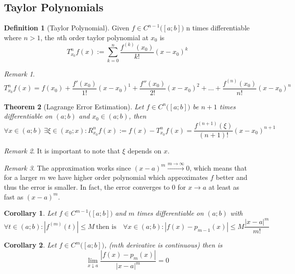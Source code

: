 \documentclass[english,titlepage]{uzhpub}
\theoremstyle{definition}
\newtheorem{definition}{Definition}[section]
\theoremstyle{plain}
\newtheorem{theorem}[definition]{Theorem} %
\newtheorem{corollary}{Corollary}[theorem]
\theoremstyle{remark}
\newtheorem*{remark}{Remark}
\theoremstyle{example}
\begin{document}
   \subsection{Taylor Polynomials}
   \begin{definition}[Taylor Polynomial]
      Given \(f \in C^{n-1}\big([a;b]\big)\) n times differentiable where \(n > 1\), the \textit{n}th order taylor polynomial at \(x_0\) is
      \[T_{x_0}^n f(x) := \sum_{k=0}^n \frac{f^{(k)}(x_0)}{k!} (x - x_0)^k\]
   \end{definition}
   \begin{remark}
      \[T_{x_0}^n f(x) = f(x_0) + \frac{f'(x_0)}{1!}(x - x_0)^1 + \frac{f''(x_0)}{2!}(x-x_0)^2 + \ldots + \frac{f^{(n)}(x_0)}{n!} (x-x_0)^n\]
   \end{remark}

   \begin{theorem}[Lagrange Error Estimation]\label{thm:talyor_approx}
      Let \(f \in C^{n}\big([a; b]\big)\) be \(n+1\) times differentiable on \((a; b)\) and \(x_0 \in (a; b)\), then
      \[\forall x \in (a;b)~\exists \xi \in (x_0; x): R_{x_0}^n f(x) := f(x) - T_{x_0}^n f(x) = \frac{f^{(n+1)}(\xi)}{(n+1)!} (x - x_0)^{n+1}\]
   \end{theorem}
   \begin{remark}
      It is important to note that \(\xi\) depends on \(x\).
   \end{remark}
   \begin{remark}
      The approximation works since \((x - a)^m \xrightarrow{m \to \infty} 0\), which means that for a larger \(m\) we have higher order polynomial which approximates \(f\) better and thus the error is smaller.
      In fact, the error converges to 0 for \(x \to a\) at least as fast as \((x - a)^m\).
   \end{remark}

   \begin{corollary}
      Let \(f \in C^{m-1}\big([a; b]\big)\) and \(m\) times differentiable on \((a; b)\) with
      \[\forall t \in (a; b): |f^{(m)}(t)| \leq M~\text{then is}\quad \forall x \in (a; b): |f(x) - p_{m-1}(x)| \leq M \frac{|x-a|^m}{m!}\]
   \end{corollary}

   \begin{corollary}\label{cor:taylor_err}
      Let \(f \in C^m\big([a; b]\big)\), (\(m\)th derivative is continuous) then is
      \[\lim_{x \downarrow a} \frac{|f(x) - p_m(x)|}{|x - a|^m} = 0\]
   \end{corollary}
\end{document}

